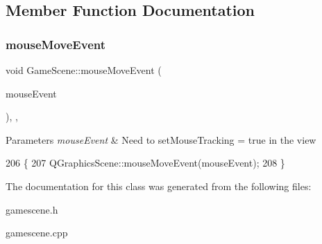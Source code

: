 \subsection{Member Function Documentation}
\mbox{\label{class_game_scene_a60e084f3ade89e765a5ff86f2c0d7bf1}} 
\subsubsection{\texorpdfstring{mouse\+Move\+Event}{mouseMoveEvent}}
{\footnotesize\ttfamily void Game\+Scene\+::mouse\+Move\+Event (\begin{DoxyParamCaption}\item[{Q\+Graphics\+Scene\+Mouse\+Event $\ast$}]{mouse\+Event }\end{DoxyParamCaption})\hspace{0.3cm}{\ttfamily [override]}, {\ttfamily [protected]}, {\ttfamily [slot]}}


\begin{DoxyParams}{Parameters}
{\em mouse\+Event} & Need to set\+Mouse\+Tracking = true in the view \\
\hline
\end{DoxyParams}

\begin{DoxyCode}
206                                                                    \{
207     QGraphicsScene::mouseMoveEvent(mouseEvent);
208 \}
\end{DoxyCode}


The documentation for this class was generated from the following files\+:\begin{DoxyCompactItemize}
\item 
gamescene.\+h\item 
gamescene.\+cpp\end{DoxyCompactItemize}
